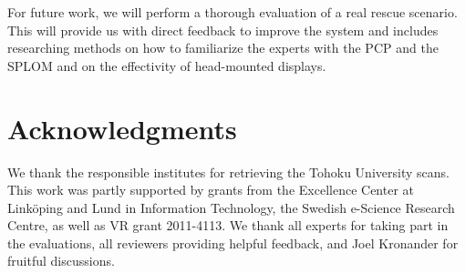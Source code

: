 \documentclass{egpubl}
\begin{document}
For future work, we will perform a thorough evaluation of a real rescue scenario. This will provide us with direct feedback to improve the system and includes researching methods on how to familiarize the experts with the PCP and the SPLOM and on the effectivity of head-mounted displays.



\section*{Acknowledgments}
We thank the responsible institutes for retrieving the Tohoku University scans. This work was partly supported by grants from the Excellence Center at Link\"oping and Lund in Information Technology, the Swedish e-Science Research Centre, as well as VR grant 2011-4113. We thank all experts for taking part in the evaluations, all reviewers providing helpful feedback, and Joel Kronander for fruitful discussions.

%


\end{document}
